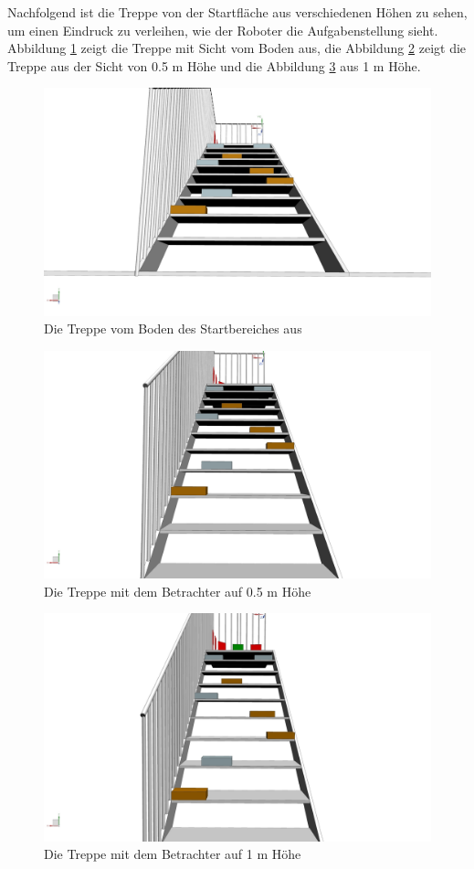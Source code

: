 Nachfolgend ist die Treppe von der Startfläche aus verschiedenen Höhen zu sehen, um einen Eindruck zu verleihen, wie der Roboter die Aufgabenstellung sieht. Abbildung \ref{fig:treppe-aufriss-boden} zeigt die Treppe mit Sicht vom Boden aus, die Abbildung \ref{fig:treppe-aufriss-0.5m} zeigt die Treppe aus der Sicht von 0.5 m Höhe und die Abbildung \ref{fig:treppe-aufriss-1m} aus 1 m Höhe.

\begin{figure}[H]
  \includegraphics[width=1\textwidth]{img/Aufgabenstellung/Boden.png}
  \centering
  \caption{Die Treppe vom Boden des Startbereiches aus}
  \label{fig:treppe-aufriss-boden}
\end{figure}

\newpage

\begin{figure}[H]
  \includegraphics[width=1\textwidth]{img/Aufgabenstellung/500mm.png}
  \centering
  \caption{Die Treppe mit dem Betrachter auf 0.5 m Höhe}
  \label{fig:treppe-aufriss-0.5m}
\end{figure}

\begin{figure}[H]
  \includegraphics[width=1\textwidth]{img/Aufgabenstellung/1000mm.png}
  \centering
  \caption{Die Treppe mit dem Betrachter auf 1 m Höhe}
  \label{fig:treppe-aufriss-1m}
\end{figure}

